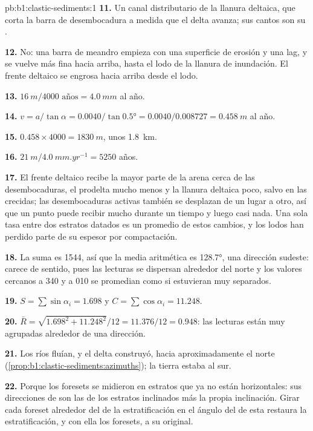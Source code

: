 \begin{solution}{pb:b1:clastic-sediments:1}
\textbf{11.} Un canal distributario de la llanura deltaica, que corta la barra de desembocadura a medida que el delta avanza; sus cantos son su .

\textbf{12.} No: una barra de meandro empieza con una superficie de erosión y una lag, y se vuelve más fina hacia arriba, hasta el lodo de la llanura de inundación. El frente deltaico se engrosa
hacia arriba desde el lodo.

\textbf{13.} $\qty{16}{m}/\num{4000}\text{ años} = \qty{4.0}{mm}$ al año.

\textbf{14.} $v = a/\tan\alpha = 0.0040/\tan\ang{0.5} = 0.0040/0.008727 =
\qty{0.458}{m}$ al año.

\textbf{15.} $0.458 \times 4000 = \qty{1830}{m}$, unos \qty{1.8}{km}.

\textbf{16.} $\qty{21}{m}/\qty{4.0}{mm.yr^{-1}} = 5250$ años.

\textbf{17.} El frente deltaico recibe la mayor parte de la arena cerca de las desembocaduras, el prodelta mucho menos y la llanura deltaica poco, salvo en las crecidas; las
desembocaduras activas también se desplazan de un lugar a otro, así que un punto puede recibir mucho durante un tiempo y luego casi nada. Una sola tasa entre dos estratos datados es un
promedio de estos cambios, y los lodos han perdido parte de su espesor por compactación.

\textbf{18.} La suma es 1544, así que la media aritmética es \ang{128.7}, una dirección sudeste: carece de sentido, pues las lecturas se dispersan alrededor del norte y los valores cercanos a 340 y a 010 se promedian como si estuvieran muy separados.

\textbf{19.} $S = \sum\sin\alpha_i = 1.698$ y $C = \sum\cos\alpha_i =
11.248$.

\textbf{20.} $\bar R = \sqrt{1.698^2 + 11.248^2}/12 = 11.376/12 = 0.948$: las lecturas están
muy agrupadas alrededor de una dirección.

\textbf{21.} Los ríos fluían, y el delta construyó, hacia aproximadamente el norte (\cref{prop:b1:clastic-sediments:azimuths}); la tierra estaba al sur.

\textbf{22.} Porque los foresets se midieron en estratos que ya no están horizontales: sus direcciones de  son las de los estratos inclinados más la propia inclinación.
Girar cada foreset alrededor del  de la estratificación en el ángulo del  de esta restaura la estratificación, y con ella los foresets, a su  original.


\end{solution}
